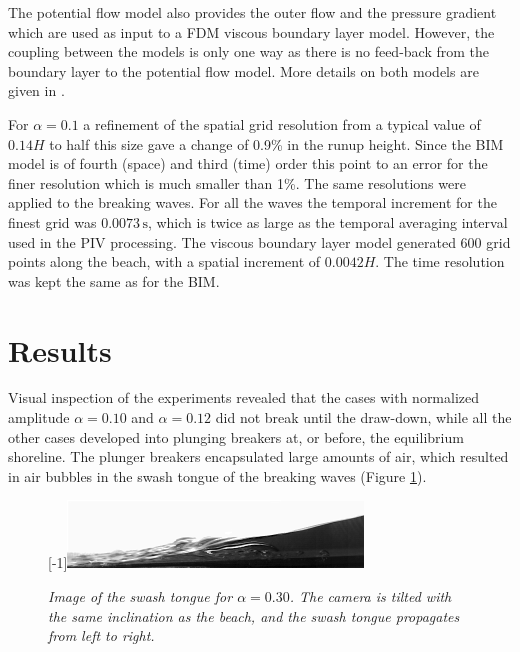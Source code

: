 \documentclass[review, authoryear]{elsarticle}
\newcommand{\s}{\,\mbox{s}}
\begin{document}
The potential flow model also provides the outer flow and the pressure gradient
which are used as input to a FDM viscous boundary layer model. However, the coupling between the
models is only one way as there is no feed-back from the boundary layer to the potential
flow model. 
More details on both models are given in \cite{pedersen2013runup}. 

For $\alpha=0.1$ a refinement of the spatial grid resolution from a typical value of $0.14H$ to half this size  gave a change of 0.9\% in the runup height. 
Since the BIM model is of fourth (space) and third (time) order this point to an error for the finer resolution which is much smaller than 1\%. The same resolutions were applied to the breaking waves.  For all the waves the temporal 
increment for the finest grid was $0.0073\s$, which is twice as large as the temporal averaging interval  used in the PIV processing. The viscous boundary layer model generated 600 grid points along the beach, with a spatial increment of $0.0042H$. The time resolution was kept the same as for the BIM.


\section{Results}
\label{result}

Visual inspection of the experiments revealed that the cases with normalized amplitude $\alpha=0.10$ and $\alpha=0.12$ did not break until the draw-down, while all the other cases developed into plunging breakers at, or before, the equilibrium shoreline. The plunger breakers encapsulated large amounts of air, which resulted in air bubbles in the swash tongue of the breaking waves (Figure \ref{fig:boble_bevis}).

\begin{figure}[]
\centering
\scalebox{1}[-1]{\includegraphics[angle=175,width=0.7\textwidth]{./Figures/BUBBLE/runup30_large_fov}}
\caption{\textit{Image of the swash tongue for $\alpha=0.30$. The camera is tilted with the same inclination as the beach, and the swash tongue propagates from left to right.}}
\label{fig:boble_bevis}
\end{figure}
\end{document}
